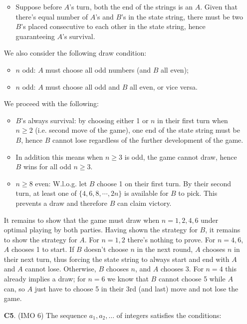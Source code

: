 \documentclass[11pt,a4paper]{article}
\begin{document}
\begin{enumerate}
\begin{itemize}
	\item Suppose before $A$'s turn, both the end of the strings is an $A$. 
	Given that there's equal number of $A$'s and $B$'s in the state string, there must be two $B$'s placed consecutive to each other in the state string, hence guaranteeing $A$'s survival. 
\end{itemize}

We also consider the following draw condition: 
\begin{itemize}
	\item $n$ odd: $A$ must choose all odd numbers (and $B$ all even); 
	\item $n$ odd: $A$ must choose all odd and $B$ all even, or vice versa. 
\end{itemize}

We proceed with the following: 
\begin{itemize}
	\item $B$'s always survival: by choosing either 1 or $n$ in their first turn when $n\ge 2$ (i.e. second move of the game), one end of the state string must be $B$, hence $B$ cannot lose regardless of the further development of the game. 
	
	\item In addition this means when $n\ge 3$ is odd, the game cannot draw, hence $B$ wins for all odd $n\ge 3$. 
	
	\item $n\ge 8$ even: W.l.o.g. let $B$ choose 1 on their first turn. By their second turn, at least one of $\{4, 6, 8, \cdots, 2n\}$ is available for $B$ to pick. This prevents a draw and therefore $B$ can claim victory. 
\end{itemize}
It remains to show that the game must draw when $n=1, 2, 4, 6$ under optimal playing by both parties. 
Having shown the strategy for $B$, it remains to show the strategy for $A$. For $n=1, 2$ there's nothing to prove. 
For $n=4, 6$, $A$ chooses 1 to start. If $B$ doesn't choose $n$ in the next round, $A$ chooses $n$ in their next turn, 
thus forcing the state string to always start and end with $A$ and $A$ cannot lose. 
Otherwise, $B$ chooses $n$, and $A$ chooses 3. 
For $n = 4$ this already implies a draw; 
for $n = 6$ we know that $B$ cannot choose 5 while $A$ can, so $A$ just have to choose 5 in their 3rd (and last) move and not lose the game. 

\item[\textbf{C5}.] (IMO 6) The sequence $a_1,a_2,\dots$ of integers satisfies the conditions:


\end{enumerate}
\end{document}
